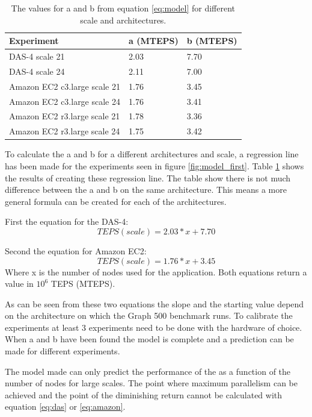 \begin{table}[!h]
	\begin{center}

	\begin{tabular}{|l|l|l|}
		\hline
		Experiment & a (MTEPS) & b  (MTEPS)\\ \hline
		DAS-4 scale 21 & 2.03 & 7.70 \\ \hline
		DAS-4 scale 24 & 2.11 & 7.00 \\ \hline
		Amazon EC2 c3.large scale 21 & 1.76 & 3.45 \\ \hline
		Amazon EC2 c3.large scale 24 & 1.76 & 3.41 \\ \hline 
		Amazon EC2 r3.large scale 21 & 1.78 & 3.36 \\ \hline 
		Amazon EC2 r3.large scale 24 & 1.75 & 3.42 \\ \hline 
	\end{tabular}
	\end{center}
	\caption{The values for a and b from equation \ref{eq:model} for different scale and architectures.}
	\label{tab:model}
\end{table}
To calculate the a and b for a different architectures and scale, a regression line has been made for the  experiments seen in figure \ref{fig:model_first}. Table \ref{tab:model} shows the results of creating these regression line. The table show there is not much difference between the a and b on the same architecture. This means a more general formula can be created for each of the architectures. 

First the equation for the DAS-4:
\begin{equation}
\label{eq:das}
TEPS(scale) = 2.03 * x + 7.70
\end{equation}

Second the equation for Amazon EC2:
\begin{equation}
\label{eq:amazon}
TEPS(scale) = 1.76 * x + 3.45
\end{equation}
Where x is the number of nodes used for the application. Both equations return a value in $10^6$ TEPS (MTEPS).

As can be seen from these two equations the slope and the starting value depend on the architecture on which the Graph 500 benchmark runs. To calibrate the experiments at least 3 experiments need to be done with the hardware of choice. When a and b have been found the model is complete and a prediction can be made for different experiments.

The model made can only predict the performance of the as a function of the number of nodes for large scales. The point where maximum parallelism can be achieved and the point of the diminishing return cannot be calculated with equation \ref{eq:das} or \ref{eq:amazon}.
